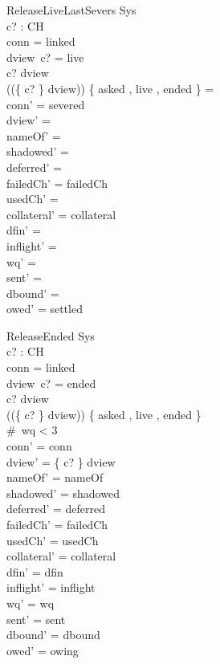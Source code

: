 \documentclass[a4paper,10pt,fleqn]{article}
\begin{document}
\begin{schema}{ReleaseLiveLastSevers}
  \Delta Sys \\
  c? : CH \\
\where
  conn = linked \\
  dview~c? = live \\
  c? \in \dom dview \\
  (\ran (\{ c? \} \ndres dview)) \cap \{ asked , live , ended \} = \emptyset \\
  conn' = severed \\
  dview' = \emptyset \\
  nameOf' = \emptyset \\
  shadowed' = \emptyset \\
  deferred' = \emptyset \\
  failedCh' = failedCh \\
  usedCh' = \emptyset \\
  collateral' = collateral \\
  dfin' = \emptyset \\
  inflight' = \langle \rangle \\
  wq' = \langle \rangle \\
  sent' = \langle \rangle \\
  dbound' = \emptyset \\
  owed' = settled
\end{schema}

\begin{schema}{ReleaseEnded}
  \Delta Sys \\
  c? : CH \\
\where
  conn = linked \\
  dview~c? = ended \\
  c? \in \dom dview \\
  (\ran (\{ c? \} \ndres dview)) \cap \{ asked , live , ended \} \neq \emptyset \\
  \#~wq < 3 \\
  conn' = conn \\
  dview' = \{ c? \} \ndres dview \\
  nameOf' = nameOf \\
  shadowed' = shadowed \\
  deferred' = deferred \\
  failedCh' = failedCh \\
  usedCh' = usedCh \\
  collateral' = collateral \\
  dfin' = dfin \\
  inflight' = inflight \\
  wq' = wq \\
  sent' = sent \\
  dbound' = dbound \\
  owed' = owing
\end{schema}
\end{document}
